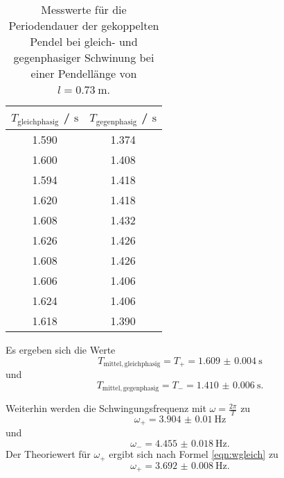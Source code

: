 \begin{table}
	\centering
	\caption{Messwerte für die Periodendauer der gekoppelten Pendel bei gleich- und
		gegenphasiger Schwinung bei einer Pendellänge von $l=\SI{0.73}{\meter}$.}
	\label{tab:beckham}
	\begin{tabular}{cc}
		\toprule
		$T_{\mathrm{gleichphasig}}$ / $\si{\second}$ & $T_{\mathrm{gegenphasig}}$
		/ $\si{\second}$ \\
		\midrule
		1.590                                        & 1.374                      \\
		1.600                                        & 1.408                      \\
		1.594                                        & 1.418                      \\
		1.620                                        & 1.418                      \\
		1.608                                        & 1.432                      \\
		1.626                                        & 1.426                      \\
		1.608                                        & 1.426                      \\
		1.606                                        & 1.406                      \\
		1.624                                        & 1.406                      \\
		1.618                                        & 1.390                      \\
		\bottomrule
	\end{tabular}
\end{table}

Es ergeben sich die Werte
\begin{equation*}
	T_{\mathrm{mittel,gleichphasig}} = T_+ = \SI{1.609(4)}{\second}
\end{equation*}
und
\begin{equation*}
	T_{\mathrm{mittel,gegenphasig}} = T_- = \SI{1.410(6)}{\second} \mathrm{.}
\end{equation*}

Weiterhin werden die Schwingungsfrequenz mit $\omega = \frac{2\pi}{T}$ zu
\begin{equation*}
	\omega_+ = \SI{3.904(10)}{\hertz}
\end{equation*}
und
\begin{equation*}
	\omega_- = \SI{4.455(18)}{\hertz} \mathrm{.}
\end{equation*}
Der Theoriewert für $\omega_+$ ergibt sich nach Formel \eqref{eqn:wgleich} zu
\begin{equation*}
	\omega_+ = \SI{3.692(8)}{\hertz} \mathrm{.}
\end{equation*}


